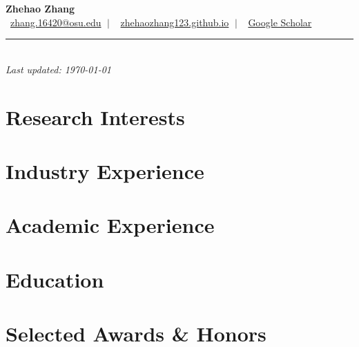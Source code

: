 \documentclass[11pt]{article}
\newcommand{\mytitle}[3]{
    \begin{center}
        \huge\textbf{#1}\normalsize \\[4pt]
        \normalsize\faEnvelope\ \href{mailto:#2}{#2} $\;|\;$ \faHome\ \href{#3}{zhehaozhang123.github.io} $\;|\;$ \faGraduationCap\ \href{https://scholar.google.com/citations?user=QG-BAGwAAAAJ&hl=en}{Google Scholar}
    \end{center}
}
\begin{document}
\mytitle{Zhehao Zhang}{zhang.16420@osu.edu}{https://zhehaozhang123.github.io}
\begin{center}
\rule{2.2cm}{0.4pt}\\[4pt]
\small\textit{Last updated: \today}
\end{center}
\RaggedRight

\section*{Research Interests}
\label{research_interests}


\section*{Industry Experience}
\label{exp_industry}


\section*{Academic Experience}
\label{exp_academic}


\section*{Education}
\label{education}


\section*{Selected Awards \& Honors}
\label{awards}


\end{document}
